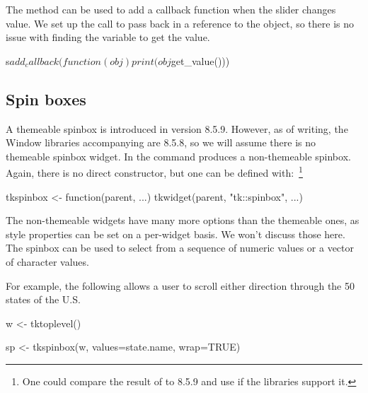 The  method can be used to add a callback function
when the slider changes value. We set up the call to pass back in a
reference to the object, so there is no issue with finding the \TCL\/
variable to get the value.
\begin{Schunk}
\begin{Sinput}
 s$add_callback(function(obj) print(obj$get_value()))
\end{Sinput}
\end{Schunk}


\subsection{Spin boxes}
\label{sec:tcltk:spinboxes}

A themeable spinbox is introduced in \TK\/ version 8.5.9. However,  as of
writing, the Window libraries accompanying \R{} are 8.5.8, so we will
assume there is no themeable spinbox widget. In \TK\/ the
 command produces a non-themeable spinbox. Again, there
is no direct  constructor, but one can be
defined with:~\footnote{One could compare the result of
   to 8.5.9 and use
   if the libraries support it.}
\begin{Schunk}
\begin{Sinput}
 tkspinbox <- function(parent, ...) 
     tkwidget(parent, "tk::spinbox", ...)
\end{Sinput}
\end{Schunk}

The non-themeable widgets have many more options than the themeable
ones, as style properties can be set on a per-widget basis. We won't
discuss those here. The spinbox can be used to select from a sequence
of numeric values or a vector of character values.


For example, the following allows a user to scroll either direction through the 50
states of the U.S.

\begin{Schunk}
\begin{Sinput}
 w <- tktoplevel()
\end{Sinput}
\end{Schunk}
\begin{Schunk}
\begin{Sinput}
 sp <- tkspinbox(w, values=state.name, wrap=TRUE)
\end{Sinput}
\end{Schunk}

